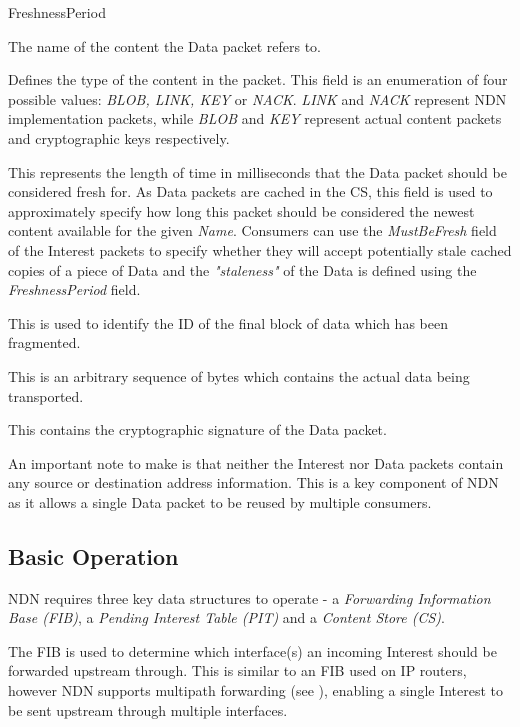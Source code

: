 \begin{labeling}{FreshnessPeriod }
    \item [Name] The name of the content the Data packet refers to.
    \item [ContentType] Defines the type of the content in the packet. This field is an enumeration of four possible values: \textit{BLOB, LINK, KEY} or \textit{NACK}. \textit{LINK} and \textit{NACK} represent NDN implementation packets, while \textit{BLOB} and \textit{KEY} represent actual content packets and cryptographic keys respectively.
    \item [FreshnessPeriod] This represents the length of time in milliseconds that the Data packet should be considered fresh for. As Data packets are cached in the CS, this field is used to approximately specify how long this packet should be considered the newest content available for the given \textit{Name}. Consumers can use the \textit{MustBeFresh} field of the Interest packets to specify whether they will accept potentially stale cached copies of a piece of Data and the \textit{"staleness"} of the Data is defined using the \textit{FreshnessPeriod} field.
    \item [FinalBlockId] This is used to identify the ID of the final block of data which has been fragmented.
    \item [Content] This is an arbitrary sequence of bytes which contains the actual data being transported.
    \item [Signature] This contains the cryptographic signature of the Data packet.
\end{labeling}

An important note to make is that neither the Interest nor Data packets contain any source or destination address information. This is a key component of NDN as it allows a single Data packet to be reused by multiple consumers. 

\subsection{Basic Operation}\label{sec:ndn-basic-operation}
NDN requires three key data structures to operate - a \textit{Forwarding Information Base (FIB)}, a \textit{Pending Interest Table (PIT)} and a \textit{Content Store (CS)}. 

The FIB is used to determine which interface(s) an incoming Interest should be forwarded upstream through. This is similar to an FIB used on IP routers, however NDN supports multipath forwarding (see ), enabling a single Interest to be sent upstream through multiple interfaces. 


